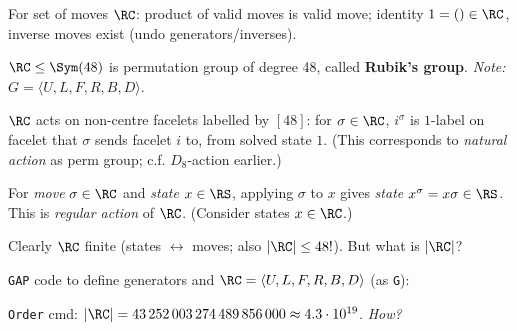 \begin{slide}
    For set of moves $\RC$: product of valid moves is valid move; identity $1 = () \in \RC$, inverse moves exist (undo generators/inverses). \pause

    \begin{definition}
        \vspace{0pt}
        $\RC \leq \Sym(48)$ is permutation group of degree 48, called \textbf{Rubik's group}. \textit{Note:} $G = \langle U,L,F,R,B,D \rangle$.
    \end{definition} \pause

    $\RC$ acts on non-centre facelets labelled by $[48]$: for $\sigma \in \RC$, $i^\sigma$ is $1$-label on facelet that $\sigma$ sends facelet $i$ to, from solved state $1$. (This corresponds to \textit{natural action} as perm group; c.f. $D_8$-action earlier.) \pause

    For \textit{move} $\sigma \in \RC$ and \textit{state} $x \in \RS$, applying $\sigma$ to $x$ gives \textit{state} $x^\sigma = x\sigma \in \RS$. This is \textit{regular action} of $\RC$. (Consider states $x \in \RC$.) \pause

    Clearly $\RC$ finite (states $\leftrightarrow$ moves; also $|\RC| \leq 48!$). But what is $|\RC|$?
\end{slide}

\begin{slide}
    \texttt{GAP} code to define generators and $\RC = \langle U,L,F,R,B,D \rangle$ (as \texttt{G}):

    {\footnotesize} \pause

    \texttt{Order} cmd: $|\RC| = 43\,252\,003\,274\,489\,856\,000 \approx 4.3 \cdot 10^{19}$. \textit{How?}
\end{slide}





